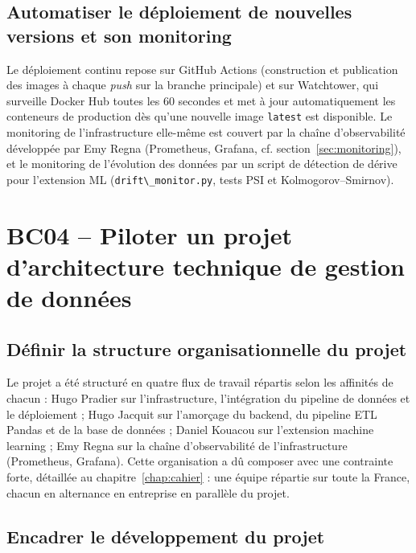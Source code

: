 \documentclass[11pt,a4paper]{report}
\newcommand{\code}[1]{\lstinline{#1}}
\begin{document}
\subsection{Automatiser le déploiement de nouvelles versions et son monitoring}

Le déploiement continu repose sur GitHub Actions (construction et publication des images à chaque \emph{push} sur la branche principale) et sur Watchtower, qui surveille Docker Hub toutes les 60 secondes et met à jour automatiquement les conteneurs de production dès qu'une nouvelle image \code{latest} est disponible. Le monitoring de l'infrastructure elle-même est couvert par la chaîne d'observabilité développée par Emy Regna (Prometheus, Grafana, cf. section~\ref{sec:monitoring}), et le monitoring de l'évolution des données par un script de détection de dérive pour l'extension ML (\code{drift\_monitor.py}, tests PSI et Kolmogorov--Smirnov).

\section{BC04 -- Piloter un projet d'architecture technique de gestion de données}

\subsection{Définir la structure organisationnelle du projet}

Le projet a été structuré en quatre flux de travail répartis selon les affinités de chacun : Hugo Pradier sur l'infrastructure, l'intégration du pipeline de données et le déploiement ; Hugo Jacquit sur l'amorçage du backend, du pipeline ETL Pandas et de la base de données ; Daniel Kouacou sur l'extension machine learning ; Emy Regna sur la chaîne d'observabilité de l'infrastructure (Prometheus, Grafana). Cette organisation a dû composer avec une contrainte forte, détaillée au chapitre~\ref{chap:cahier} : une équipe répartie sur toute la France, chacun en alternance en entreprise en parallèle du projet.

\subsection{Encadrer le développement du projet}
\end{document}
